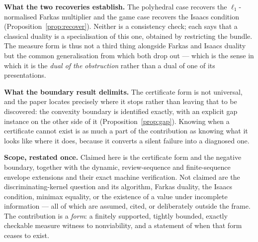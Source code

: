 \documentclass[10pt,twocolumn]{article}
\theoremstyle{definition}
\begin{document}
\textbf{What the two recoveries establish.} The polyhedral case recovers the
\(\ell_{1}\)-normalised Farkas multiplier and the game case recovers the Isaacs condition
(Proposition~\ref{prop:recover}). Neither is a consistency check; each says that a classical
duality is a specialisation of this one, obtained by restricting the bundle. The measure form
is thus not a third thing alongside Farkas and Isaacs duality but the common generalisation
from which both drop out --- which is the sense in which it is the \emph{dual of the
obstruction} rather than a dual of one of its presentations.

\textbf{What the boundary result delimits.} The certificate form is not universal, and the
paper locates precisely where it stops rather than leaving that to be discovered: the convexity
boundary is identified exactly, with an explicit gap instance on the other side of it
(Proposition~\ref{prop:gap}). Knowing when a certificate cannot exist is as much a part of the
contribution as knowing what it looks like where it does, because it converts a silent failure
into a diagnosed one.

\textbf{Scope, restated once.} Claimed here is the certificate form and the negative boundary,
together with the dynamic, review-sequence and finite-sequence envelope extensions and their
exact machine verification. Not claimed are the discriminating-kernel question and its
algorithm, Farkas duality, the Isaacs condition, minimax equality, or the existence of a value
under incomplete information --- all of which are assumed, cited, or deliberately outside the
frame. The contribution is a \emph{form}: a finitely supported, tightly bounded, exactly
checkable measure witness to nonviability, and a statement of when that form ceases to exist.
\end{document}
